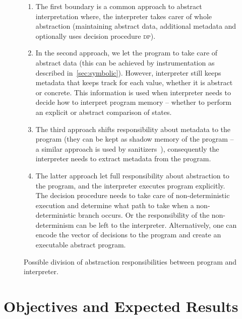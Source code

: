 \begin{figure}[h]
\begin{enumerate}
    \item The first boundary is a common approach to abstract
        interpretation where, the interpreter takes carer of whole abstraction
        (maintaining abstract data, additional metadata and optionally uses
        decision procedure \textsc{dp}).
    \item In the second approach, we let the program to take care of abstract
        data (this can be achieved by instrumentation as described
        in~\autoref{sec:symbolic}).  However, interpreter still keeps metadata
        that keeps track for each value, whether it is abstract or concrete.
        This information is used when interpreter needs to decide how to
        interpret program memory -- whether to perform an explicit or abstract
        comparison of states.
    \item The third approach shifts responsibility about metadata to
        the program (they can be kept as shadow memory of the program -- a
        similar approach is used by sanitizers~\cite{Stepanov2015}), consequently the
        interpreter needs to extract metadata from the program.
    \item The latter approach let full responsibility about abstraction to the
        program, and the interpreter executes program explicitly. The decision
        procedure needs to take care of non-deterministic execution and
        determine what path to take when a non-deterministic branch occurs. Or
        the responsibility of the non-determinism can be left to the
        interpreter. Alternatively, one can encode the vector of decisions to
        the program and create an executable abstract program.
\end{enumerate}

\caption{Possible division of abstraction responsibilities between program and interpreter.}
\label{fig:bounds}

\end{figure}



\section{Objectives and Expected Results}
\label{sec:objectives}

